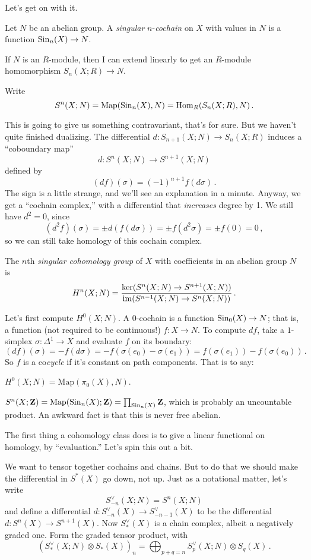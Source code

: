 Let's get on with it.
\begin{definition}
Let $N$ be an abelian group. A {\em singular} $n$-{\em cochain} on $X$ with values in $N$ is a function $\mathrm{Sin}_n(X)\to N$. 
\end{definition}
If $N$ is an $R$-module, then I can extend linearly to get an $R$-module homomorphism $S_n(X;R)\to N$.
\begin{notation}
Write 
\[
S^n(X;N)=\operatorname{Map}(\mathrm{Sin}_n(X),N)=\operatorname{Hom}_R(S_n(X;R),N)\,.
\]
\end{notation}
This is going to give us something contravariant, that's for sure. But we 
haven't quite finished dualizing. The differential 
$d:S_{n+1}(X;N)\to S_n(X;R)$ 
induces a ``coboundary map'' 
\[
d:S^n(X;N)\to S^{n+1}(X;N)
\]
defined by
\[
(df)(\sigma)=(-1)^{n+1}f(d\sigma)\,.
\]
The sign is a little strange, and we'll see an explanation in a minute.
Anyway, we get a ``cochain complex,'' with a differential that {\em increases}
degree by 1. We still have $d^2=0$, since
\[
(d^2f)(\sigma)=\pm d(f(d\sigma))=\pm f(d^2\sigma)=\pm f(0)=0\,,
\]
so we can still take homology of this cochain complex. 
\begin{definition}
The $n$th {\em singular cohomology group} of $X$ with coefficients in an abelian group $N$ is 
\[
H^n(X;N)=
\frac{\ker(S^n(X;N)\to S^{n+1}(X;N))}{\operatorname{im}(S^{n-1}(X;N)\to S^n(X;N))}\,.
\]
\end{definition}

Let's first compute $H^0(X;N)$. A $0$-cochain is a function $\mathrm{Sin}_0(X)\to N$;
that is, a function (not required to be continuous!) $f:X\to N$. To compute 
$df$, take a $1$-simplex $\sigma:\Delta^1\to X$ and evaluate $f$ 
on its boundary:
\[
(df)(\sigma)=-f(d\sigma)=-f(\sigma(e_0)-\sigma(e_1))=
f(\sigma(e_1))-f(\sigma(e_0))\,.
\]
So $f$ is a co{\em cycle} if it's constant on path components. That is to say:
\begin{lemma}
$H^0(X;N)=\mathrm{Map}(\pi_0(X),N)$.
\end{lemma}
\begin{warning}
$S^n(X;\mathbf Z)=\operatorname{Map}(\mathrm{Sin}_n(X);\mathbf Z)=\prod_{\mathrm{Sin}_n(X)}\mathbf Z$, which is probably an uncountable product. An awkward fact is that this is never free abelian.
\end{warning}

The first thing a cohomology class does is to give a linear functional
on homology, by ``evaluation.'' Let's spin this out a bit. 

We want to tensor together cochains and chains. But to do that we should make
the differential in $S^*(X)$ go down, not up. Just as a notational matter, 
let's write
\[
S^\vee_{-n}(X;N)=S^n(X;N)
\]
and define a differential $d:S^\vee_{-n}(X)\to S^\vee_{-n-1}(X)$ to be the
differential $d:S^n(X)\to S^{n+1}(X)$. Now $S^\vee_\ast(X)$ is a chain
complex, albeit a negatively graded one. Form the graded tensor product, with
\[
\left(S^\vee_\ast(X;N)\otimes S_\ast(X)\right)_n=
\bigoplus_{p+q=n}S^\vee_p(X;N)\otimes S_q(X)\,.
\]

